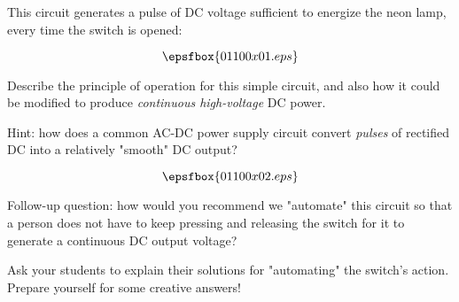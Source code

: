 

This circuit generates a pulse of DC voltage sufficient to energize the neon lamp, every time the switch is opened:

$$\epsfbox{01100x01.eps}$$

Describe the principle of operation for this simple circuit, and also how it could be modified to produce {\it continuous high-voltage} DC power.

\vskip 10pt

Hint: how does a common AC-DC power supply circuit convert {\it pulses} of rectified DC into a relatively "smooth" DC output?







$$\epsfbox{01100x02.eps}$$

\vskip 10pt

Follow-up question: how would you recommend we "automate" this circuit so that a person does not have to keep pressing and releasing the switch for it to generate a continuous DC output voltage?







Ask your students to explain their solutions for "automating" the switch's action.  Prepare yourself for some creative answers!




